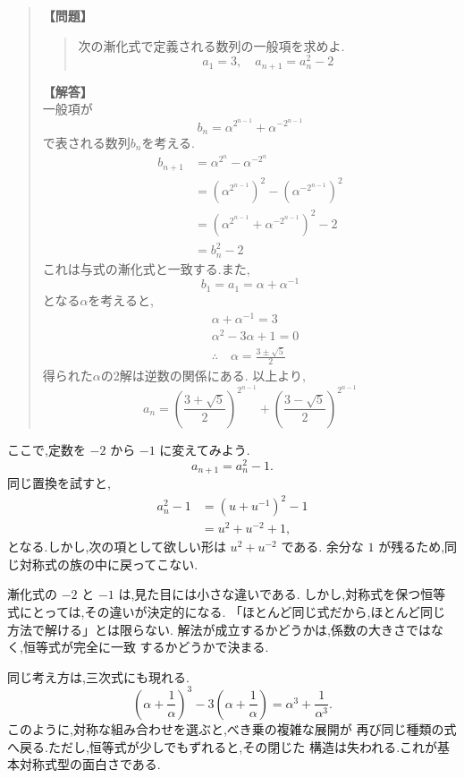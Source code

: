 \begin{quote}
\textbf{【問題】}
\begin{quote}
  次の漸化式で定義される数列の一般項を求めよ.
  \[
    a_1=3, \quad a_{n+1}=a_n^2-2
  \]
\end{quote}
\textbf{【解答】}\\一般項が
  \[
    b_n=\alpha^{2^{n-1}}+\alpha^{-2^{n-1}}
  \]
  で表される数列$b_n$を考える.
  \begin{align*}
    b_{n+1}&=\alpha^{2^{n}}-\alpha^{-2^{n}}\\
    &=\left(\alpha^{2^{n-1}}\right)^2-\left(\alpha^{-2^{n-1}}\right)^2\\
    &=\left(\alpha^{2^{n-1}}+\alpha^{-2^{n-1}}\right)^2-2\\
    &=b_n^2-2
  \end{align*}
  これは与式の漸化式と一致する.また,
  \[
    b_1=a_1=\alpha+\alpha^{-1}
  \]
  となる$\alpha$を考えると,
  \begin{align*}
    &\alpha+\alpha^{-1}=3\\
    &\alpha^2-3\alpha+1=0\\
    &\therefore \quad \alpha=\frac{3\pm \sqrt{5}}{2}
  \end{align*}
  得られた$\alpha$の2解は逆数の関係にある.
  以上より,
  \[
    a_n=\left(\frac{3+ \sqrt{5}}{2}\right)^{2^{n-1}}+\left(\frac{3- \sqrt{5}}{2}\right)^{2^{n-1}}
  \]
\begin{quote}
  
\end{quote}
\end{quote}

ここで,定数を $-2$ から $-1$ に変えてみよう.
\[
  a_{n+1}=a_n^2-1.
\]
同じ置換を試すと,
\begin{align*}
  a_n^2-1
    &=\left(u+u^{-1}\right)^2-1\\
    &=u^2+u^{-2}+1,
\end{align*}
となる.しかし,次の項として欲しい形は $u^2+u^{-2}$ である.
余分な $1$ が残るため,同じ対称式の族の中に戻ってこない.

漸化式の $-2$ と $-1$ は,見た目には小さな違いである.
しかし,対称式を保つ恒等式にとっては,その違いが決定的になる.
「ほとんど同じ式だから,ほとんど同じ方法で解ける」とは限らない.
解法が成立するかどうかは,係数の大きさではなく,恒等式が完全に一致
するかどうかで決まる.

同じ考え方は,三次式にも現れる.
\[
  \left(\alpha+\frac{1}{\alpha}\right)^3
  -3\left(\alpha+\frac{1}{\alpha}\right)
  =\alpha^3+\frac{1}{\alpha^3}.
\]
このように,対称な組み合わせを選ぶと,べき乗の複雑な展開が
再び同じ種類の式へ戻る.ただし,恒等式が少しでもずれると,その閉じた
構造は失われる.これが基本対称式型の面白さである.

